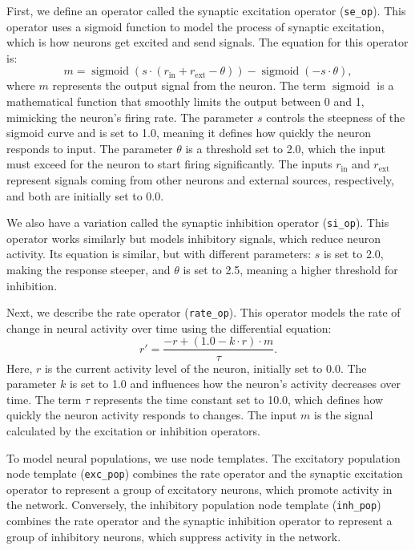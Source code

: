\documentclass[12pt]{article}
\begin{document}
First, we define an operator called the synaptic excitation operator (\texttt{se\_op}). This operator uses a sigmoid function to model the process of synaptic excitation, which is how neurons get excited and send signals. The equation for this operator is:
\[
m = \operatorname{sigmoid}(s \cdot (r_{\mathrm{in}} + r_{\mathrm{ext}} - \theta)) - \operatorname{sigmoid}(-s \cdot \theta),
\]
where \( m \) represents the output signal from the neuron. The term \(\operatorname{sigmoid}\) is a mathematical function that smoothly limits the output between 0 and 1, mimicking the neuron's firing rate. The parameter \( s \) controls the steepness of the sigmoid curve and is set to 1.0, meaning it defines how quickly the neuron responds to input. The parameter \(\theta\) is a threshold set to 2.0, which the input must exceed for the neuron to start firing significantly. The inputs \( r_{\mathrm{in}} \) and \( r_{\mathrm{ext}} \) represent signals coming from other neurons and external sources, respectively, and both are initially set to 0.0.

We also have a variation called the synaptic inhibition operator (\texttt{si\_op}). This operator works similarly but models inhibitory signals, which reduce neuron activity. Its equation is similar, but with different parameters: \( s \) is set to 2.0, making the response steeper, and \( \theta \) is set to 2.5, meaning a higher threshold for inhibition.

Next, we describe the rate operator (\texttt{rate\_op}). This operator models the rate of change in neural activity over time using the differential equation:
\[
r' = \frac{-r + (1.0 - k \cdot r) \cdot m}{\tau}.
\]
Here, \( r \) is the current activity level of the neuron, initially set to 0.0. The parameter \( k \) is set to 1.0 and influences how the neuron's activity decreases over time. The term \( \tau \) represents the time constant set to 10.0, which defines how quickly the neuron activity responds to changes. The input \( m \) is the signal calculated by the excitation or inhibition operators.

To model neural populations, we use node templates. The excitatory population node template (\texttt{exc\_pop}) combines the rate operator and the synaptic excitation operator to represent a group of excitatory neurons, which promote activity in the network. Conversely, the inhibitory population node template (\texttt{inh\_pop}) combines the rate operator and the synaptic inhibition operator to represent a group of inhibitory neurons, which suppress activity in the network.
\end{document}
